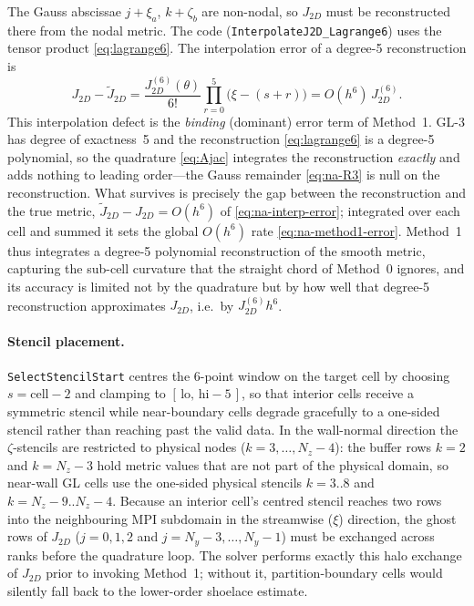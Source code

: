\documentclass[11pt]{article}
\theoremstyle{definition}
\theoremstyle{remark}
\begin{document}
The Gauss abscissae $j+\xi_a$, $k+\zeta_b$ are non-nodal, so $J_{2D}$ must be
reconstructed there from the nodal metric. The code
(\texttt{InterpolateJ2D\_Lagrange6}) uses the tensor product
\eqref{eq:lagrange6}. The interpolation error of a degree-5 reconstruction is
\begin{equation}
  J_{2D}-\tilde{J}_{2D}
  = \frac{J_{2D}^{(6)}(\theta)}{6!}\prod_{r=0}^{5}\bigl(\xi-(s+r)\bigr)
  = O(h^6)\,J_{2D}^{(6)} .
  \label{eq:na-interp-error}
\end{equation}
This interpolation defect is the \emph{binding} (dominant) error term of Method~1.
GL-3 has degree of exactness~5 and the reconstruction \eqref{eq:lagrange6} is a
degree-5 polynomial, so the quadrature \eqref{eq:Ajac} integrates the reconstruction
\emph{exactly} and adds nothing to leading order---the Gauss remainder
\eqref{eq:na-R3} is null on the reconstruction. What survives is precisely the gap
between the reconstruction and the true metric, $\tilde{J}_{2D}-J_{2D}=O(h^6)$ of
\eqref{eq:na-interp-error}; integrated over each cell and summed it sets the global
$O(h^6)$ rate \eqref{eq:na-method1-error}. Method~1 thus integrates a degree-5
polynomial reconstruction of the smooth metric, capturing the sub-cell curvature that
the straight chord of Method~0 ignores, and its accuracy is limited not by the
quadrature but by how well that degree-5 reconstruction approximates $J_{2D}$, i.e.\
by $J_{2D}^{(6)}h^6$.

\paragraph{Stencil placement.}
\texttt{SelectStencilStart} centres the 6-point window on the target cell by
choosing $s=\mathrm{cell}-2$ and clamping to $[\,\text{lo},\,\text{hi}-5\,]$, so
that interior cells receive a symmetric stencil while near-boundary cells degrade
gracefully to a one-sided stencil rather than reaching past the valid data. In the
wall-normal direction the $\zeta$-stencils are restricted to physical nodes
($k=3,\dots,N_z{-}4$): the buffer rows $k=2$ and $k=N_z{-}3$ hold metric values
that are not part of the physical domain, so near-wall GL cells use the one-sided
physical stencils $k=3..8$ and $k=N_z{-}9..N_z{-}4$. Because an interior cell's
centred stencil reaches two rows into the neighbouring MPI subdomain in the
streamwise ($\xi$) direction, the ghost rows of $J_{2D}$ ($j=0,1,2$ and
$j=N_y{-}3,\dots,N_y{-}1$) must be exchanged across ranks before the quadrature
loop. The solver performs exactly this halo exchange of $J_{2D}$ prior to invoking
Method~1; without it, partition-boundary cells would silently fall back to the
lower-order shoelace estimate.
\end{document}
